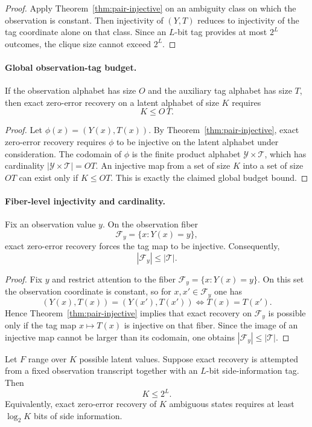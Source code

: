 \begin{proof}
Apply Theorem~\ref{thm:pair-injective} on an ambiguity class on which the observation is constant. Then injectivity of $(Y,T)$ reduces to injectivity of the tag coordinate alone on that class. Since an $L$-bit tag provides at most $2^L$ outcomes, the clique size cannot exceed $2^L$.
\end{proof}

\paragraph{Global observation-tag budget.}
If the observation alphabet has size $O$ and the auxiliary tag alphabet has size $T$, then exact zero-error recovery on a latent alphabet of size $K$ requires
\[
K \le O\,T.
\]

\begin{proof}
Let $\phi(x)=(Y(x),T(x))$. By Theorem~\ref{thm:pair-injective}, exact zero-error recovery requires $\phi$ to be injective on the latent alphabet under consideration. The codomain of $\phi$ is the finite product alphabet $\mathcal Y\times\mathcal T$, which has cardinality $|\mathcal Y\times\mathcal T|=OT$. An injective map from a set of size $K$ into a set of size $OT$ can exist only if $K\le OT$. This is exactly the claimed global budget bound.
\end{proof}

\paragraph{Fiber-level injectivity and cardinality.}
Fix an observation value $y$. On the observation fiber
\[
\mathcal F_y=\{x : Y(x)=y\},
\]
exact zero-error recovery forces the tag map to be injective. Consequently,
\[
|\mathcal F_y| \le |\mathcal T|.
\]

\begin{proof}
Fix $y$ and restrict attention to the fiber $\mathcal F_y=\{x:Y(x)=y\}$. On this set the observation coordinate is constant, so for $x,x'\in\mathcal F_y$ one has
\[
(Y(x),T(x))=(Y(x'),T(x')) \iff T(x)=T(x').
\]
Hence Theorem~\ref{thm:pair-injective} implies that exact recovery on $\mathcal F_y$ is possible only if the tag map $x\mapsto T(x)$ is injective on that fiber. Since the image of an injective map cannot be larger than its codomain, one obtains $|\mathcal F_y|\le |\mathcal T|$.
\end{proof}

\begin{proposition}\label{thm:fano-converse}
Let $F$ range over $K$ possible latent values. Suppose exact recovery is attempted from a fixed observation transcript together with an $L$-bit side-information tag. Then
\[
K \le 2^L.
\]
Equivalently, exact zero-error recovery of $K$ ambiguous states requires at least $\log_2 K$ bits of side information.
\end{proposition}


